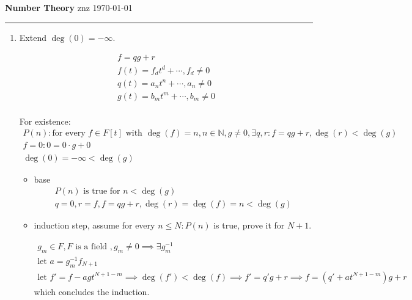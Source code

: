 \documentclass[12pt]{article}
\begin{document}
\noindent
{\large\bfseries Number Theory}
\hfill
znz
\quad
\today

\hrule
\medskip

\begin{enumerate}
  \item
        Extend $\deg(0) = -\infty$.

        \[
        \begin{gathered}
          f = qg + r \\
          f(t) = f_{d}t^{d} + \cdots, f_d \neq 0 \\
          q(t) = a_{n}t^{n} + \cdots, a_n \neq 0 \\
          g(t) = b_{m}t^{m} + \cdots, b_m \neq 0 \\
        \end{gathered}
        \]

        For existence:
        \[
        \begin{gathered}
        P(n)\colon \text{for every }f\in F[t]\text{ with }\deg(f)=n, n \in \mathbb{N}, g \neq 0, \exists q, r \colon f=qg + r, \deg(r) < \deg(g) \\
        f = 0 \colon 0 = 0 \cdot g + 0 \\
        \deg(0) = -\infty < \deg(g)
        \end{gathered}
        \]
        \begin{itemize}
          \item base
                \[
                \begin{gathered}
                  P(n) \text{ is true for } n < \deg(g) \\
                  q=0, r=f, f=qg+r, \deg(r) = \deg(f) = n < \deg(g)
                \end{gathered}
                \]
          \item induction step, assume for every $n \leq N \colon P(n)$ is true, prove it for $N + 1$.

                \[
                \begin{gathered}
                  g_{m} \in F, F \text{ is a field }, g_{m}\neq 0 \implies \exists g_{m}^{-1} \\
                  \text{let } a=g_{m}^{-1}f_{N+1} \\
                  \text{let } f'=f - agt^{N+1-m} \implies \deg(f') < \deg(f) \implies
                  f'=q'g + r \implies f=(q' + at^{N+1-m})g + r
                \end{gathered}
                \]
                which concludes the induction.
        \end{itemize}


\end{enumerate}
\end{document}
